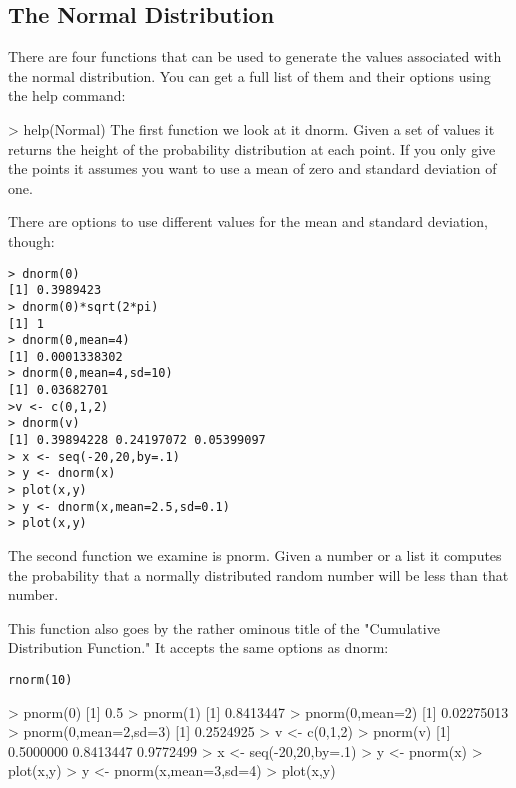 
\newenvironment{myindentpar}[1]%
{\begin{list}{}%
         {\setlength{\leftmargin}{#1}}%
         \item[]%
} {\end{list}}



\subsection{The Normal Distribution}

There are four functions that can be used to generate the values associated with the normal distribution. You can get a full list of them and their options using the help command:

> help(Normal)
The first function we look at it dnorm. Given a set of values it returns the height of the probability distribution at each point. If you only give the points it assumes you want to use a mean of zero and standard deviation of one.

There are options to use different values for the mean and standard deviation, though:


\begin{myindentpar}{1cm}
\footnotesize \begin{verbatim}
> dnorm(0)
[1] 0.3989423
> dnorm(0)*sqrt(2*pi)
[1] 1
> dnorm(0,mean=4)
[1] 0.0001338302
> dnorm(0,mean=4,sd=10)
[1] 0.03682701
>v <- c(0,1,2)
> dnorm(v)
[1] 0.39894228 0.24197072 0.05399097
> x <- seq(-20,20,by=.1)
> y <- dnorm(x)
> plot(x,y)
> y <- dnorm(x,mean=2.5,sd=0.1)
> plot(x,y)
\end{verbatim}\normalsize
\end{myindentpar}

The second function we examine is pnorm. Given a number or a list it computes the probability that a normally distributed random number will be less than that number.

This function also goes by the rather ominous title of the "Cumulative Distribution Function." It accepts the same options as dnorm:

\begin{myindentpar}{1cm}
\footnotesize \begin{verbatim}
rnorm(10)
\end{verbatim}\normalsize
\end{myindentpar}
> pnorm(0)
[1] 0.5
> pnorm(1)
[1] 0.8413447
> pnorm(0,mean=2)
[1] 0.02275013
> pnorm(0,mean=2,sd=3)
[1] 0.2524925
> v <- c(0,1,2)
> pnorm(v)
[1] 0.5000000 0.8413447 0.9772499
> x <- seq(-20,20,by=.1)
> y <- pnorm(x)
> plot(x,y)
> y <- pnorm(x,mean=3,sd=4)
> plot(x,y)

